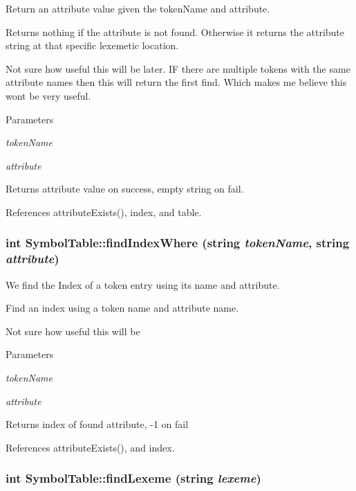 Return an attribute value given the tokenName and attribute.

Returns nothing if the attribute is not found. Otherwise it returns the attribute string at that specific lexemetic location.

Not sure how useful this will be later. IF there are multiple tokens with the same attribute names then this will return the first find. Which makes me believe this wont be very useful. 
\begin{DoxyParams}{Parameters}
\item[{\em tokenName}]\item[{\em attribute}]\end{DoxyParams}
\begin{DoxyReturn}{Returns}
attribute value on success, empty string on fail. 
\end{DoxyReturn}


References attributeExists(), index, and table.

\hypertarget{classSymbolTable_a61a3da421ef79fffe47e8e2d3065bb05}{
\subsubsection[{findIndexWhere}]{\setlength{\rightskip}{0pt plus 5cm}int SymbolTable::findIndexWhere (string {\em tokenName}, \/  string {\em attribute})}}
\label{classSymbolTable_a61a3da421ef79fffe47e8e2d3065bb05}


We find the Index of a token entry using its name and attribute. 

Find an index using a token name and attribute name.

Not sure how useful this will be 
\begin{DoxyParams}{Parameters}
\item[{\em tokenName}]\item[{\em attribute}]\end{DoxyParams}
\begin{DoxyReturn}{Returns}
index of found attribute, -\/1 on fail 
\end{DoxyReturn}


References attributeExists(), and index.

\hypertarget{classSymbolTable_a33fa9fe363246a0b54e9f58191ad931e}{
\subsubsection[{findLexeme}]{\setlength{\rightskip}{0pt plus 5cm}int SymbolTable::findLexeme (string {\em lexeme})}}
\label{classSymbolTable_a33fa9fe363246a0b54e9f58191ad931e}


